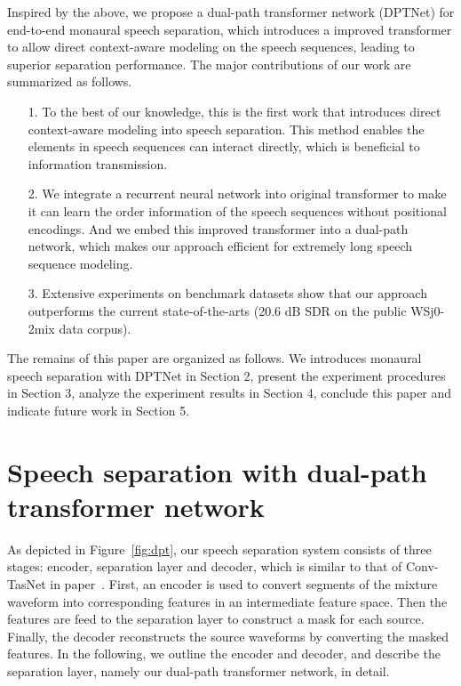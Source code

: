 \documentclass[a4paper]{article}
\begin{document}
Inspired by the above, we propose a dual-path transformer network (DPTNet) for end-to-end monaural speech separation, which introduces a improved transformer to allow direct context-aware modeling on the speech sequences, leading to superior separation performance. The major contributions of our work are summarized as follows.

\begin{itemize}
\item[1.] To the best of our knowledge, this is the first work that introduces direct context-aware modeling into speech separation. This method enables the elements in speech sequences can interact directly, which is beneficial to information transmission.
\item[2.] We integrate a recurrent neural network into original transformer to make it can learn the order information of the speech sequences without positional encodings. And we embed this improved transformer into a dual-path network, which makes our approach efficient for extremely long speech sequence modeling.
\item[3.] Extensive experiments on benchmark datasets show that our approach outperforms the current state-of-the-arts (20.6 dB SDR on the public WSj0-2mix data corpus).
\end{itemize}



The remains of this paper are organized as follows. We introduces monaural speech separation with DPTNet in Section 2, present the experiment procedures in Section 3, analyze the experiment results in Section 4, conclude this paper and indicate future work in Section 5.

\section{Speech separation with dual-path transformer network}

As depicted in Figure~\ref{fig:dpt}, our speech separation system consists of three stages: encoder, separation layer and decoder, which is similar to that of Conv-TasNet in paper~\cite{luo2019conv}. First, an encoder is used to convert segments of the mixture waveform into corresponding features in an intermediate feature space. Then the features are feed to the separation layer to construct a mask for each source. Finally, the decoder reconstructs the source waveforms by converting the masked features. In the following, we outline the encoder and decoder, and describe the separation layer, namely our dual-path transformer network, in detail.
\end{document}
